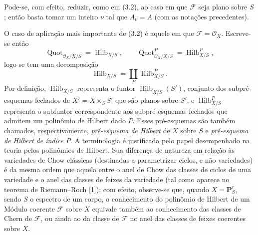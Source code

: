 Pode-se, com efeito, reduzir, como em (3.2), ao caso em que $\mathcal F$ seja
plano sobre $S$; então basta tomar um inteiro $\nu$ tal que $A_\nu=A$ (com as
notações precedentes).

O caso de aplicação mais importante de (3.2) é aquele em que
$\mathcal F=\mathcal O_X$. Escreve-se então
\[
\operatorname{Quot}_{\mathcal O_X/X/S}=\operatorname{Hilb}_{X/S},
\qquad
\operatorname{Quot}^P_{\mathcal O_X/X/S}=\operatorname{Hilb}^P_{X/S},
\]
logo se tem uma decomposição
\[
\operatorname{Hilb}_{X/S}=\coprod_P\operatorname{Hilb}^P_{X/S}.
\]
Por definição, $\operatorname{Hilb}_{X/S}$ representa o funtor
$\underline{\operatorname{Hilb}}_{X/S}(S')$, conjunto dos subpré-esquemas
fechados de $X'=X\times_SS'$ que são planos sobre $S'$, e
$\operatorname{Hilb}^P_{X/S}$ representa o subfuntor correspondente aos
subpré-esquemas fechados que admitem um polinômio de Hilbert dado $P$. Esses
pré-esquemas são também chamados, respectivamente, \emph{pré-esquema de
Hilbert} de $X$ sobre $S$ e \emph{pré-esquema de Hilbert de índice $P$}. A
terminologia é justificada pelo papel desempenhado na teoria pelos polinômios
de Hilbert. Sua diferença de natureza em relação às variedades de Chow
clássicas (destinadas a parametrizar ciclos, e não variedades) é da mesma ordem
que aquela entre
o anel de Chow das classes de ciclos de uma variedade e o anel das classes
de feixes da variedade (tal como aparece no teorema de Riemann--Roch [1]);
com efeito, observe-se que, quando $X=\mathbf P^r_S$, sendo $S$ o espectro
de um corpo, o conhecimento do polinômio de Hilbert de um Módulo coerente
$\mathcal F$ sobre $X$ equivale também ao conhecimento das classes de Chern
de $\mathcal F$, ou ainda ao da classe de $\mathcal F$ no anel das classes de
feixes coerentes sobre $X$.

